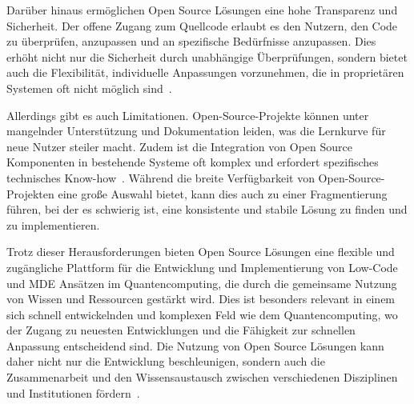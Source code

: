 Darüber hinaus ermöglichen Open Source Lösungen eine hohe Transparenz und Sicherheit. Der offene Zugang 
zum Quellcode erlaubt es den Nutzern, den Code zu überprüfen, anzupassen und an spezifische Bedürfnisse 
anzupassen. Dies erhöht nicht nur die Sicherheit durch unabhängige Überprüfungen, sondern bietet auch 
die Flexibilität, individuelle Anpassungen vorzunehmen, die in proprietären Systemen oft nicht 
möglich sind~\cite{von2006promise}.

Allerdings gibt es auch Limitationen. Open-Source-Projekte können unter mangelnder Unterstützung und 
Dokumentation leiden, was die Lernkurve für neue Nutzer steiler macht. Zudem ist die Integration von 
Open Source Komponenten in bestehende Systeme oft komplex und erfordert spezifisches technisches 
Know-how~\cite{chesbrough2006open}. Während die breite Verfügbarkeit von Open-Source-Projekten eine große 
Auswahl bietet, kann dies auch zu einer Fragmentierung führen, bei der es schwierig ist, eine konsistente 
und stabile Lösung zu finden und zu implementieren.

Trotz dieser Herausforderungen bieten Open Source Lösungen eine flexible und zugängliche Plattform für 
die Entwicklung und Implementierung von Low-Code und MDE Ansätzen im Quantencomputing, 
die durch die gemeinsame Nutzung von Wissen und Ressourcen gestärkt 
wird. Dies ist besonders relevant in einem sich schnell entwickelnden und komplexen Feld wie dem 
Quantencomputing, wo der Zugang zu neuesten Entwicklungen und die Fähigkeit zur schnellen Anpassung 
entscheidend sind. Die Nutzung von Open Source Lösungen kann daher nicht nur die Entwicklung 
beschleunigen, sondern auch die Zusammenarbeit und den Wissensaustausch zwischen verschiedenen 
Disziplinen und Institutionen fördern~\cite{west2006challenges}.

